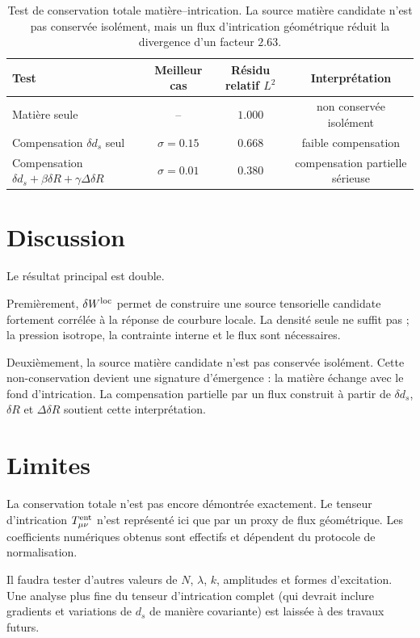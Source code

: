 \documentclass[11pt,a4paper]{article}
\begin{document}
\begin{table}[htbp]
\centering
\begin{tabular}{l c c c}
\toprule
Test & Meilleur cas & Résidu relatif \(L^2\) & Interprétation \\
\midrule
Matière seule & -- & \(1.000\) & non conservée isolément \\
Compensation \(\delta d_s\) seul & \(\sigma = 0.15\) & \(0.668\) & faible compensation \\
Compensation \(\delta d_s + \beta\delta R + \gamma\Delta\delta R\) & \(\sigma = 0.01\) & \(0.380\) & compensation partielle sérieuse \\
\bottomrule
\end{tabular}
\caption{
Test de conservation totale matière--intrication. La source matière candidate
n'est pas conservée isolément, mais un flux d'intrication géométrique réduit la
divergence d'un facteur \(2.63\).
}
\end{table}

\section{Discussion}

Le résultat principal est double.

Premièrement, \(\delta W^{\rm loc}\) permet de construire une source tensorielle
candidate fortement corrélée à la réponse de courbure locale. La densité seule
ne suffit pas ; la pression isotrope, la contrainte interne et le flux sont
nécessaires.

Deuxièmement, la source matière candidate n'est pas conservée isolément. Cette
non-conservation devient une signature d'émergence : la matière échange avec le
fond d'intrication. La compensation partielle par un flux construit à partir de
\(\delta d_s\), \(\delta R\) et \(\Delta\delta R\) soutient cette interprétation.

\section{Limites}

La conservation totale n'est pas encore démontrée exactement. Le tenseur
d'intrication \(T_{\mu\nu}^{\rm ent}\) n'est représenté ici que par un proxy de
flux géométrique. Les coefficients numériques obtenus sont effectifs et
dépendent du protocole de normalisation.

Il faudra tester d'autres valeurs de \(N\), \(\lambda\), \(k\), amplitudes et
formes d'excitation. Une analyse plus fine du tenseur d'intrication complet
(qui devrait inclure gradients et variations de \(d_s\) de manière covariante)
est laissée à des travaux futurs.
\end{document}
